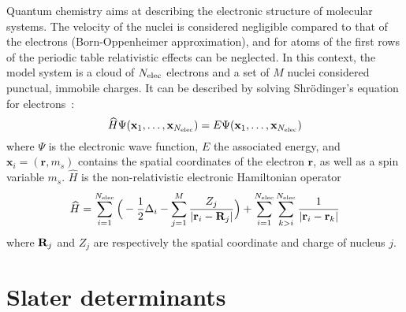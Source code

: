 \documentclass[./thesis.tex]{subfiles}
\begin{document}
\label{chap:METHODS}

Quantum chemistry aims at describing the electronic structure of molecular
systems.  The velocity of the nuclei is considered negligible compared to that
of the electrons (Born-Oppenheimer approximation), and for atoms of the first
rows of the periodic table relativistic effects can be neglected.  In this
context, the model system is a cloud of ${N_\text{elec}}$ electrons and a set of $M$ nuclei
considered punctual, immobile charges. It can be described by solving
Shrödinger's equation for electrons~:
\begin{equation}
 \widehat{H} \Psi({\bf x}_1,\dots,{\bf x}_{N_\text{elec}}) = E \Psi({\bf x}_1,\dots,{\bf x}_{N_\text{elec}})
\end{equation}
where $\Psi$ is the electronic wave function, $E$ the associated energy, and $\mathbf{x}_i = (\textbf{r},m_s)$
contains the spatial coordinates of the electron $\textbf{r}$, as well as a spin variable $m_s$.
$\widehat H$ is the non-relativistic electronic Hamiltonian operator
\begin{equation}
\widehat{H} = \sum_{i=1}^{{N_\text{elec}}} \Big ( -\frac{1}{2} \Delta_i - \sum_{j=1}^M \frac{Z_j}{|{\bf r}_i - {\bf R}_j|} \Big ) + \sum_{i=1}^{{N_\text{elec}}} \sum_{k>i}^{{N_\text{elec}}} \frac{1}{|{\bf r}_i - {\bf r}_k|}
\end{equation}
where ${\bf R}_j$ and $Z_j$ are respectively the spatial coordinate and charge of nucleus $j$.

\section{Slater determinants}
\end{document}
